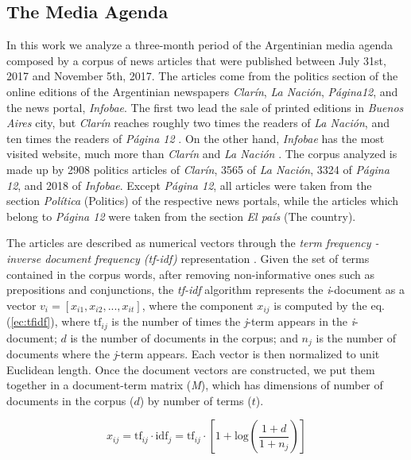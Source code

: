 \documentclass{bmcart}
\begin{document}
\subsection*{The Media Agenda}
\par In this work we analyze a three-month period of the Argentinian media agenda composed by a corpus of news articles that were published between July 31st, 2017 and November 5th, 2017. 
The articles come from the politics section of the online editions of the Argentinian newspapers \emph{Clar\'in}, \emph{La Naci\'on}, \emph{P\'agina12}, and the news portal, \emph{Infobae}. The first two lead the sale of printed editions in \emph{Buenos Aires} city, but \emph{Clar\'in} reaches roughly two times the readers of \emph{La Naci\'on}, and ten times the readers of \emph{P\'agina 12} \cite{IVC}. On the other hand, \emph{Infobae} has the most visited website, much more than \emph{Clar\'in} and \emph{La Naci\'on} \cite{AlexaAR}.
The corpus analyzed is made up by 2908 politics articles of \emph{Clar\'in}, 3565 of \emph{La Naci\'on}, 3324 of \emph{P\'agina 12}, and 2018 of \emph{Infobae}. Except \emph{P\'agina 12}, all articles were taken from the section \emph{Pol\'itica}  (Politics) of the respective news portals, while the articles which belong to \emph{P\'agina 12} were taken from the section \emph{El pa\'is} (The country).

\par The articles are described as numerical vectors through the \textit{term frequency - inverse document frequency (tf-idf)} representation \cite{xu2003document}. 
Given the set of terms contained in the corpus words, after removing non-informative ones such as prepositions and conjunctions, the \textit{tf-idf} algorithm represents the \textit{i}-document as a vector $v_i = [x_{i1}, x_{i2}, ... , x_{it}]$, where the component $x_{ij}$ is computed by the eq.(\ref{ec:tfidf}), where $\textrm{tf}_{ij}$ is the number of times the \textit{j}-term appears in the \textit{i}-document; $d$ is the number of documents in the corpus; and $n_j$ is the number of documents where the \textit{j}-term appears. 
Each vector is then normalized to unit Euclidean length. 
Once the document vectors are constructed, we put them together in a document-term matrix (\emph{M}), which has dimensions of number of documents in the corpus ($d$) by number of terms ($t$).

\begin{equation}
x_{ij} = \textrm{tf}_{ij} \cdot \textrm{idf}_{j} = \textrm{tf}_{ij} \cdot [1 + \textrm{log}(\frac{1 + d}{1 + n_j})] 
\label{ec:tfidf}
\end{equation}
\end{document}
